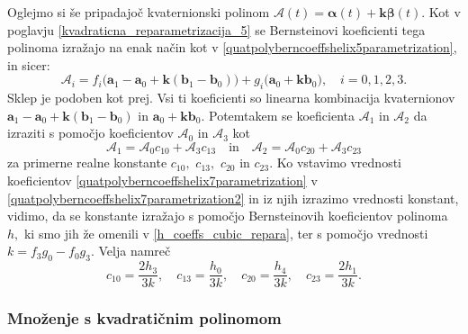 \documentclass[12pt,a4paper,twoside]{article}
\theoremstyle{definition} %
\theoremstyle{plain} %
\theoremstyle{primerstyle}
\numberwithin{equation}{section}  %
\newcommand{\aV}{\mathbf{a}}
\newcommand{\bV}{\mathbf{b}}
\newcommand{\kV}{\mathbf{k}}
\newcommand{\AQ}{\mathcal{A}}
\newcommand{\balpha}{\boldsymbol \alpha}
\newcommand{\bbeta}{\boldsymbol \beta}
\begin{document}
Oglejmo si še pripadajoč kvaternionski polinom $\AQ(t)=\balpha(t)+\kV\bbeta(t).$ Kot v poglavju \ref{kvadraticna_reparametrizacija_5} se Bernsteinovi koeficienti tega polinoma izražajo na enak način kot v \eqref{quatpolyberncoeffshelix5parametrization}, in sicer:
\begin{equation}
	\label{quatpolyberncoeffshelix7parametrization}
	\AQ_i=f_i\big(\aV_1-\aV_0+\kV(\bV_1-\bV_0)\big)+g_i\big(\aV_0+\kV\bV_0\big),\quad i=0,1,2,3.
\end{equation}
Sklep je podoben kot prej. Vsi ti koeficienti so linearna kombinacija kvaternionov $\aV_1-\aV_0+\kV(\bV_1-\bV_0)$ in $\aV_0+\kV\bV_0$. Potemtakem se koeficienta $\AQ_1$ in $\AQ_2$ da izraziti s pomočjo koeficientov $\AQ_0$ in $\AQ_3$ kot
\begin{equation}
	\label{quatpolyberncoeffshelix7parametrization2}
	\AQ_1=\AQ_0c_{10}+\AQ_3c_{13}\quad\text{in}\quad\AQ_2=\AQ_0c_{20}+\AQ_3c_{23}
\end{equation}
za primerne realne konstante $c_{10},$ $c_{13},$ $c_{20}$ in $c_{23}.$ Ko vstavimo vrednosti koeficientov \eqref{quatpolyberncoeffshelix7parametrization} v \eqref{quatpolyberncoeffshelix7parametrization2} in iz njih izrazimo vrednosti konstant, vidimo, da se konstante izražajo s pomočjo Bernsteinovih koeficientov polinoma $h,$ ki smo jih že omenili v \eqref{h_coeffs_cubic_repara}, ter s pomočjo vrednosti $k=f_3g_0-f_0g_3.$ Velja namreč
\begin{equation*}
	c_{10}=\frac{2h_3}{3k},\quad c_{13}=\frac{h_0}{3k},\quad c_{20}=\frac{h_4}{3k},\quad c_{23}=\frac{2h_1}{3k}.
\end{equation*}

\subsubsection{Množenje s kvadratičnim polinomom}
\label{mnozenje_kvadraticni_polinom_7}
\end{document}
